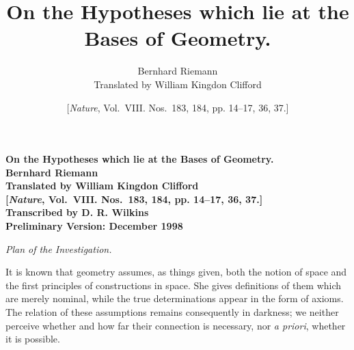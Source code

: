 \documentclass[a4paper,12pt]{article}
\begin{document}
\thispagestyle{empty}
\begin{center}
\Large\bfseries
On the Hypotheses which lie at the Bases of Geometry.\\[12 pt]
Bernhard Riemann\\[12 pt]
Translated by William Kingdon Clifford\\[12 pt]
[\emph{Nature}, Vol.~VIII.  Nos.~183, 184, pp. 14--17, 36, 37.]\\[24 pt]
\large\mdseries
Transcribed by D. R. Wilkins\\[12 pt]
Preliminary Version: December 1998
\end{center}

\newpage
\setcounter{page}{1}


\title{On the Hypotheses which lie at the Bases of Geometry.}
\author{Bernhard Riemann\\
Translated by William Kingdon Clifford}
\date{[\emph{Nature}, Vol.~VIII.  Nos.~183, 184, pp. 14--17, 36, 37.]}
\maketitle

\begin{center}
\emph{Plan of the Investigation.}
\end{center}

It is known that geometry assumes, as things given, both the
notion of space and the first principles of constructions in
space.  She gives definitions of them which are merely nominal,
while the true determinations appear in the form of axioms.  The
relation of these assumptions remains consequently in darkness;
we neither perceive whether and how far their connection is
necessary, nor \emph{a priori}, whether it is possible.
\end{document}
